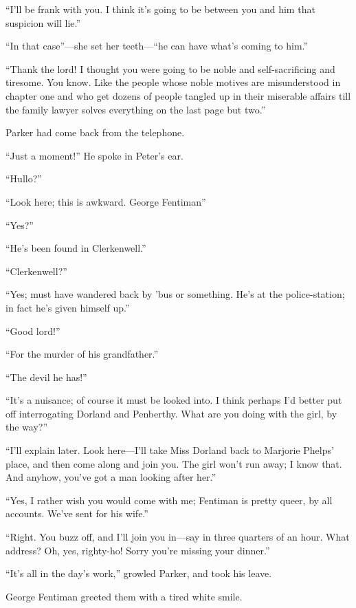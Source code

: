 \enquote{I'll be frank with you. I think it's going to be between you and him that suspicion will lie.}

\enquote{In that case}---she set her teeth---\enquote{he can have what's coming to him.}

\enquote{Thank the lord! I thought you were going to be noble and self-sacrificing and tiresome. You know. Like the people whose noble motives are misunderstood in chapter one and who get dozens of people tangled up in their miserable affairs till the family lawyer solves everything on the last page but two.}

Parker had come back from the telephone.

\enquote{Just a moment!} He spoke in Peter's ear.

\enquote{Hullo?}

\enquote{Look here; this is awkward. George Fentiman\longdash}

\enquote{Yes?}

\enquote{He's been found in Clerkenwell.}

\enquote{Clerkenwell?}

\enquote{Yes; must have wandered back by 'bus or something. He's at the police-station; in fact he's given himself up.}

\enquote{Good lord!}

\enquote{For the murder of his grandfather.}

\enquote{The devil he has!}

\enquote{It's a nuisance; of course it must be looked into. I think perhaps I'd better put off interrogating Dorland and Penberthy. What are you doing with the girl, by the way?}

\enquote{I'll explain later. Look here\allowbreak---\allowbreak I'll take Miss Dorland back to Marjorie Phelps' place, and then come along and join you. The girl won't run away; I know that. And anyhow, you've got a man looking after her.}

\enquote{Yes, I rather wish you would come with me; Fentiman is pretty queer, by all accounts. We've sent for his wife.}

\enquote{Right. You buzz off, and I'll join you in\allowbreak---\allowbreak say in three quarters of an hour. What address? Oh, yes, righty-ho! Sorry you're missing your dinner.}

\enquote{It's all in the day's work,} growled Parker, and took his leave.

George Fentiman greeted them with a tired white smile.

